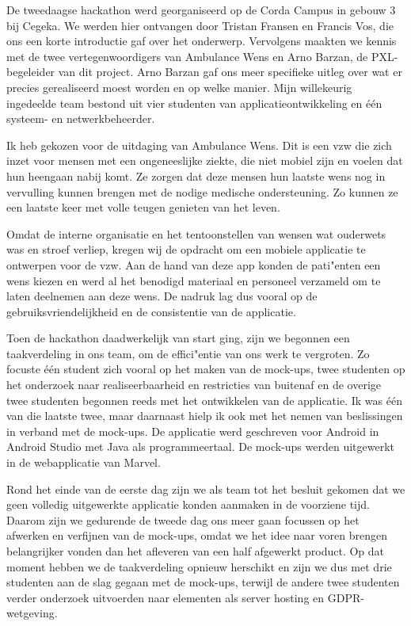 
De tweedaagse hackathon werd georganiseerd op de Corda Campus in gebouw 3 bij Cegeka. We werden hier ontvangen door Tristan Fransen en Francis Vos, die ons een korte introductie gaf over het onderwerp. Vervolgens maakten we kennis met de twee vertegenwoordigers van Ambulance Wens en Arno Barzan, de PXL\hyp{}begeleider van dit project. Arno Barzan gaf ons meer specifieke uitleg over wat er precies gerealiseerd moest worden en op welke manier. Mijn willekeurig ingedeelde team bestond uit vier studenten van applicatieontwikkeling en één systeem\hyp{} en netwerkbeheerder.

Ik heb gekozen voor de uitdaging van Ambulance Wens. Dit is een vzw die zich inzet voor mensen met een ongeneeslijke ziekte, die niet mobiel zijn en voelen dat hun heengaan nabij komt. Ze zorgen dat deze mensen hun laatste wens nog in vervulling kunnen brengen met de nodige medische ondersteuning. Zo kunnen ze een laatste keer met volle teugen genieten van het leven.

Omdat de interne organisatie en het tentoonstellen van wensen wat ouderwets was en stroef verliep, kregen wij de opdracht om een mobiele applicatie te ontwerpen voor de vzw. Aan de hand van deze app konden de pati"enten een wens kiezen en werd al het benodigd materiaal en personeel verzameld om te laten deelnemen aan deze wens. De nadruk lag dus vooral op de gebruiksvriendelijkheid en de consistentie van de applicatie.

Toen de hackathon daadwerkelijk van start ging, zijn we begonnen een taakverdeling in ons team, om de effici"entie van ons werk te vergroten. Zo focuste één student zich vooral op het maken van de mock\hyp{}ups, twee studenten op het onderzoek naar realiseerbaarheid en restricties van buitenaf en de overige twee studenten begonnen reeds met het ontwikkelen van de applicatie. Ik was één van die laatste twee, maar daarnaast hielp ik ook met het nemen van beslissingen in verband met de mock\hyp{}ups. De applicatie werd geschreven voor Android in Android Studio met Java als programmeertaal. De mock\hyp{}ups werden uitgewerkt in de webapplicatie van Marvel.

Rond het einde van de eerste dag zijn we als team tot het besluit gekomen dat we geen volledig uitgewerkte applicatie konden aanmaken in de voorziene tijd. Daarom zijn we gedurende de tweede dag ons meer gaan focussen op het afwerken en verfijnen van de mock\hyp{}ups, omdat we het idee naar voren brengen belangrijker vonden dan het afleveren van een half afgewerkt product. Op dat moment hebben we de taakverdeling opnieuw herschikt en zijn we dus met drie studenten aan de slag gegaan met de mock\hyp{}ups, terwijl de andere twee studenten verder onderzoek uitvoerden naar elementen als server hosting en GDPR\hyp{}wetgeving.

